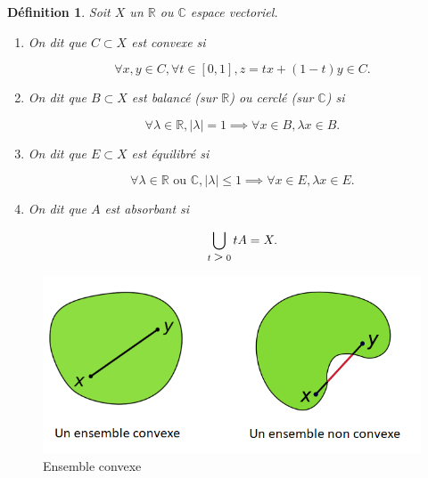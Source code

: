 \documentclass[french]{book}
\newtheorem{definition}{Définition}[section]
\newcommand{\biggg}{\rotatebox[origin=c]{90}{$\lor$}}
\newcommand{\bg}{\ \biggg\ }
\begin{document}
\begin{definition}
  Soit $X$ un $\mathbb{R}$ ou $\mathbb{C}$ espace vectoriel.

  \begin{enumerate}
    \item On dit que $C \subset X$ est convexe si

    \begin{equation*}
      \forall x, y \in C, \forall t \in  [0, 1], z = tx + (1-t)y \in C.
    \end{equation*}

    \item On dit que $B \subset X$ est balancé (sur $\mathbb{R}$) ou cerclé (sur $\mathbb{C}$) si

    \begin{equation*}
      \forall \lambda  \in \mathbb{R}, \lvert \lambda  \rvert = 1 \implies \forall x \in B, \lambda x \in B.
    \end{equation*}

    \item On dit que $E \subset X$ est équilibré si

    \begin{equation*}
      \forall \lambda  \in \mathbb{R} \text{ ou } \mathbb{C}, \lvert \lambda  \rvert \leq 1 \implies \forall x \in E, \lambda x \in E.
    \end{equation*}

    \item On dit que $A$ est absorbant si

    \begin{equation*}
      \bigcup _{t \bg 0} t A = X.
    \end{equation*}
  \end{enumerate}
\end{definition}

\begin{figure}[h!]
  \centering
  \includegraphics[scale=0.5]{figures/convexe1.png}
  \caption{Ensemble convexe}
  \label{}
\end{figure}
\end{document}
